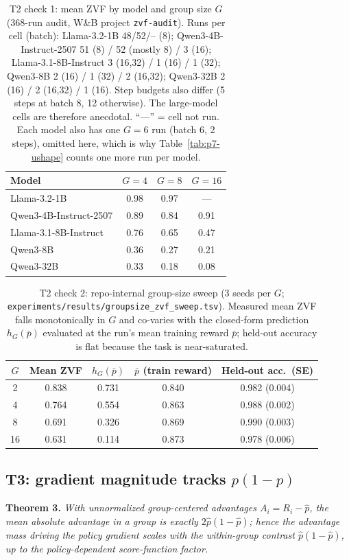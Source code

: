 \begin{table}[t]
\centering
\caption{T2 check 1: mean ZVF by model and group size $G$ (368-run audit,
W\&B project \texttt{zvf-audit}). Runs per cell (batch): Llama-3.2-1B 48/52/--
(8); Qwen3-4B-Instruct-2507 51 (8) / 52 (mostly 8) / 3 (16); Llama-3.1-8B-Instruct 3 (16,32) / 1 (16)
/ 1 (32); Qwen3-8B 2 (16) / 1 (32) / 2 (16,32); Qwen3-32B 2 (16) / 2 (16,32) /
1 (16). Step budgets also differ (5 steps at batch 8, 12 otherwise). The
large-model cells are therefore anecdotal. ``---'' = cell not run. Each model
also has one $G{=}6$ run (batch 6, 2 steps), omitted here, which is why
Table~\ref{tab:p7-ushape} counts one more run per model.}
\label{tab:p7-modelG}
\begin{tabular}{lccc}
\toprule
Model & $G{=}4$ & $G{=}8$ & $G{=}16$ \\
\midrule
Llama-3.2-1B        & 0.98 & 0.97 & --- \\
Qwen3-4B-Instruct-2507 & 0.89 & 0.84 & 0.91 \\
Llama-3.1-8B-Instruct & 0.76 & 0.65 & 0.47 \\
Qwen3-8B            & 0.36 & 0.27 & 0.21 \\
Qwen3-32B           & 0.33 & 0.18 & 0.08 \\
\bottomrule
\end{tabular}
\end{table}

\begin{table}[t]
\centering
\caption{T2 check 2: repo-internal group-size sweep (3 seeds per $G$;
\texttt{experiments/results/groupsize\_zvf\_sweep.tsv}). Measured mean ZVF
falls monotonically in $G$ and co-varies with the closed-form prediction
$h_G(\bar p)$ evaluated at the run's mean training reward $\bar p$; held-out
accuracy is flat because the task is near-saturated.}
\label{tab:p7-gsweep}
\begin{tabular}{ccccc}
\toprule
$G$ & Mean ZVF & $h_G(\bar p)$ & $\bar p$ (train reward) & Held-out acc.\ (SE) \\
\midrule
2  & 0.838 & 0.731 & 0.840 & 0.982 (0.004) \\
4  & 0.764 & 0.554 & 0.863 & 0.988 (0.002) \\
8  & 0.691 & 0.326 & 0.869 & 0.990 (0.003) \\
16 & 0.631 & 0.114 & 0.873 & 0.978 (0.006) \\
\bottomrule
\end{tabular}
\end{table}

\subsection{T3: gradient magnitude tracks \texorpdfstring{$p(1-p)$}{p(1-p)}}
\label{sec:p7-t3}
\textbf{Theorem 3.} \emph{With unnormalized group-centered advantages
$A_i = R_i - \hat p$, the mean absolute advantage in a group is exactly
$2\hat p(1 - \hat p)$; hence the advantage mass driving the policy gradient
scales with the within-group contrast $\hat p(1-\hat p)$, up to the
policy-dependent score-function factor.}

